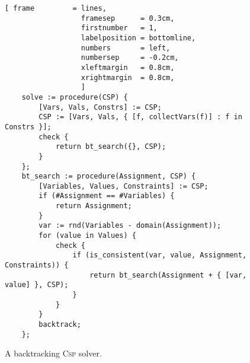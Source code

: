 \begin{figure}[!ht]
\centering
\begin{Verbatim}[ frame         = lines, 
                  framesep      = 0.3cm, 
                  firstnumber   = 1,
                  labelposition = bottomline,
                  numbers       = left,
                  numbersep     = -0.2cm,
                  xleftmargin   = 0.8cm,
                  xrightmargin  = 0.8cm,
                  ]
    solve := procedure(CSP) {
        [Vars, Vals, Constrs] := CSP;
        CSP := [Vars, Vals, { [f, collectVars(f)] : f in Constrs }];
        check {
            return bt_search({}, CSP);
        }
    };
    bt_search := procedure(Assignment, CSP) {
        [Variables, Values, Constraints] := CSP;
        if (#Assignment == #Variables) {
            return Assignment;
        }
        var := rnd(Variables - domain(Assignment));
        for (value in Values) {
            check {
                if (is_consistent(var, value, Assignment, Constraints)) {
                    return bt_search(Assignment + { [var, value] }, CSP);
                }
            }
        }
        backtrack;
    };
\end{Verbatim}
\vspace*{-0.3cm}
\caption{A backtracking \textsc{Csp} solver.}
\label{fig:csp-backtrack-solver.stlx-1}
\end{figure}
